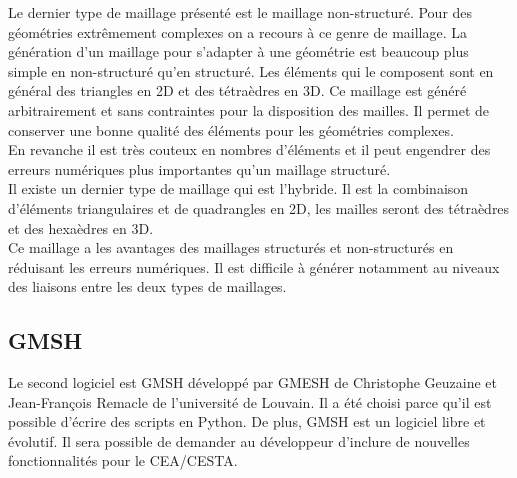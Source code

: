 Le dernier type de maillage présenté est le maillage non-structuré. Pour des géométries extrêmement complexes on a recours à ce genre de maillage. La génération d'un maillage pour s'adapter à une géométrie est beaucoup plus simple en non-structuré qu’en structuré. Les éléments qui le composent sont en général des triangles en 2D et des tétraèdres en 3D. Ce maillage est généré arbitrairement et sans contraintes pour la disposition des mailles. Il permet de conserver une bonne qualité des éléments pour les géométries complexes.\\
En revanche il est très couteux en nombres d'éléments et il peut engendrer des erreurs numériques plus importantes qu’un maillage structuré.\\
Il existe un dernier type de maillage qui est l’hybride. Il est la combinaison d'éléments triangulaires et de quadrangles en 2D, les mailles seront des tétraèdres et des hexaèdres en 3D.\\
Ce maillage a les avantages des maillages structurés et non-structurés en réduisant les erreurs numériques. Il est difficile à générer notamment au niveaux des liaisons entre les deux types de maillages.



\subsection{GMSH}
Le second logiciel est GMSH développé par GMESH de Christophe Geuzaine et Jean-François Remacle de l'université de Louvain. Il a été choisi parce qu'il est possible d'écrire des scripts en Python. De plus, GMSH est un logiciel libre et évolutif. Il sera possible de demander au développeur d'inclure de nouvelles fonctionnalités pour le CEA/CESTA.

